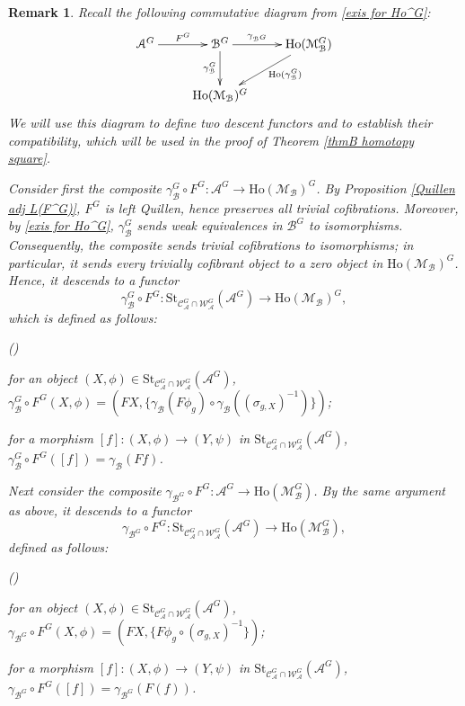 \documentclass[12pt,twoside]{amsart}
\theoremstyle{bfupright head,slanted body}
\theoremstyle{bfupright head,upright body}
\theoremstyle{fixed bf head,slanted body}
\theoremstyle{fixed bf head,upright body}
\newtheorem{rmk}[res]{Remark}           \newtheorem*{rmk*}{Remark}
\theoremstyle{numbered paragraph}
\newlength{\thmlistleft}        %
\newlength{\thmlistright}       %
\newlength{\thmlistpartopsep}   %
\newlength{\thmlisttopsep}      %
\newlength{\thmlistparsep}      %
\newlength{\thmlistitemsep}     %
\newcounter{rqm}
\newenvironment{rqm}{\begin{list}{\upshape (\arabic{rqm})}%
    {\usecounter{rqm}%
      \setlength{\leftmargin}{\thmlistleft}%
      \setlength{\labelwidth}{\thmlistleft}%
      \setlength{\rightmargin}{\thmlistright}%
      \setlength{\partopsep}{\thmlistpartopsep}%
      \setlength{\topsep}{\thmlisttopsep}%
      \setlength{\parsep}{\thmlistparsep}%
      \setlength{\itemsep}{\thmlistitemsep}}}%
  {\end{list}}%
\numberwithin{equation}{res}
\newcommand{\calC}{\mathcal{C}}
\newcommand{\calW}{\mathcal{W}}
\newcommand{\calA}{\mathcal{A}}
\newcommand{\calB}{\mathcal{B}}
\newcommand{\calM}{\mathcal{M}}
\newcommand{\Ho}{\mathrm{Ho}}
\newcommand{\St}{\mathrm{St}}
\begin{document}
\begin{rmk} \label{descend and com}
Recall the following commutative diagram from \ref{exis for Ho^G}:
\[
\xymatrix{
   \calA^G \ar[r]^-{F^G} & \calB^G \ar[d]_(0.45){\gamma_\calB^G} \ar[r]^-{\gamma_{\calB^G}} & \Ho(\calM_\calB^G) \ar[dl]^(0.4){\Ho(\gamma_\calB^G)} \\
   & \Ho(\calM_\calB)^G
}
\]
We will use this diagram to define two descent functors and to establish their compatibility, which will be used in the proof of Theorem \ref{thmB homotopy square}.

Consider first the composite $\gamma_\calB^G \circ F^G: \calA^G \to \Ho(\calM_\calB)^G$.
By Proposition \ref{Quillen adj L(F^G)}, $F^G$ is left Quillen, hence preserves all trivial cofibrations.
Moreover, by \ref{exis for Ho^G}, $\gamma_\calB^G$ sends weak equivalences in $\calB^G$ to isomorphisms.
Consequently, the composite sends trivial cofibrations to isomorphisms; in particular, it sends every trivially cofibrant object to a zero object in $\Ho(\calM_\calB)^G$.
Hence, it descends to a functor
\[
\gamma_\calB^G \circ F^G: \St_{\calC_\calA^G \cap \calW_\calA^G}(\calA^G) \to \Ho(\calM_{\calB})^G,
\]
which is defined as follows:
\begin{rqm}
\item[$\bullet$]
for an object $(X, \phi) \in \St_{\calC_\calA^G \cap \calW_\calA^G}(\calA^G)$, $\gamma_\calB^G \circ F^G(X, \phi) = (FX, \{\gamma_\calB(F \phi_g) \circ \gamma_\calB((\sigma_{g, X})^{-1})\})$;
\item[$\bullet$]
for a morphism $[f] : (X, \phi) \to (Y, \psi)$ in $\St_{\calC_\calA^G \cap \calW_\calA^G}(\calA^G)$, $\gamma_\calB^G \circ F^G([f]) = \gamma_\calB(F f)$.
\end{rqm}

Next consider the composite $\gamma_{\calB^G} \circ F^G : \calA^G \to \Ho(\calM_\calB^G)$.
By the same argument as above, it descends to a functor
\[
\gamma_{\calB^G} \circ F^G: \St_{\calC_\calA^G \cap \calW_\calA^G}(\calA^G) \to \Ho(\calM_{\calB}^G),
\]
defined as follows:
\begin{rqm}
\item[$\bullet$]
for an object $(X, \phi) \in \St_{\calC_\calA^G \cap \calW_\calA^G}(\calA^G)$, $\gamma_{\calB^G} \circ F^G(X, \phi) = (FX, \{F \phi_g \circ (\sigma_{g, X})^{-1}\})$;
\item[$\bullet$]
for a morphism $[f] : (X, \phi) \to (Y, \psi)$ in $\St_{\calC_\calA^G \cap \calW_\calA^G}(\calA^G)$, $\gamma_{\calB^G} \circ F^G([f]) = \gamma_{\calB^G}(F(f))$.
\end{rqm}


\end{rmk}
\end{document}
